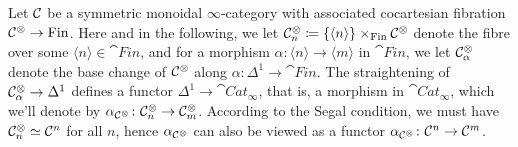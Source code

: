 \begin{numpar}\label{par:UnravellingSymmetricMonoidal}
	Let $\mathcal{C}$ be a symmetric monoidal $\infty$-category with associated cocartesian fibration $\mathcal{C}^\otimes\rightarrow \mathrm{Fin}$. Here and in the following, we let $\mathcal{C}_n^\otimes\coloneqq \{\langle n\rangle\}\times_{\mathrm{Fin}}\mathcal{C}^\otimes$ denote the fibre over some $\langle n\rangle \in\cat{Fin}$, and for a morphism $\alpha\colon \langle n\rangle\rightarrow \langle m\rangle$ in $\cat{Fin}$, we let $\mathcal{C}^\otimes_\alpha$ denote the base change of $\mathcal{C}^\otimes$ along $\alpha\colon \Delta^1\rightarrow \cat{Fin}$. The straightening of $\mathcal{C}_\alpha^\otimes\rightarrow \Delta^1$ defines a functor $\Delta^1\rightarrow \cat{Cat}_\infty$, that is, a morphism in $\cat{Cat}_\infty$, which we'll denote by $\alpha_{\mathcal{C}^\otimes}\colon \mathcal{C}_n^\otimes\rightarrow \mathcal{C}_m^\otimes$. According to the Segal condition, we must have $\mathcal{C}^\otimes_n\simeq \mathcal{C}^n$ for all $n$, hence $\alpha_{\mathcal{C}^\otimes}$ can also be viewed as a functor $\alpha_{\mathcal{C}^\otimes}\colon \mathcal{C}^n\rightarrow \mathcal{C}^m$.
	

\end{numpar}
